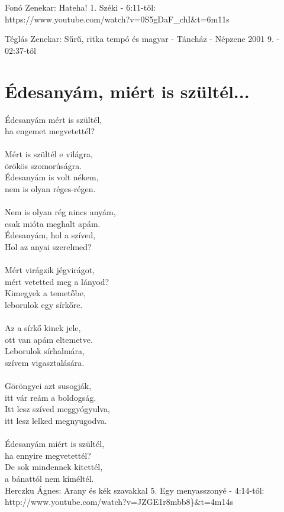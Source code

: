 Fonó Zenekar: Hateha! 1. Széki - 6:11-től:\\
https://www.youtube.com/watch?v=0S5gDaF\_chI\&t=6m11s

Téglás Zenekar: Sűrű, ritka tempó és magyar - Táncház - Népzene 2001 9. - 02:37-től

\section{Édesanyám, miért is szültél...}
Édesanyám mért is szültél,\\
ha engemet megvetettél?\\\\
Mért is szültél e világra,\\
örökös szomorúságra.\\
Édesanyám is volt nékem,\\
nem is olyan réges-régen.\\\\
Nem is olyan rég nincs anyám,\\
csak mióta meghalt apám.\\
Édesanyám, hol a szíved,\\
Hol az anyai szerelmed?\\\\
Mért virágzik jégvirágot,\\
mért vetetted meg a lányod?\\
Kimegyek a temetőbe,\\
leborulok egy sírkőre.\\\\
Az a sírkő kinek jele,\\
ott van apám eltemetve.\\
Leborulok sírhalmára,\\
szívem vigasztalására.\\\\
Göröngyei azt susogják,\\
itt vár reám a boldogság.\\
Itt lesz szíved meggyógyulva,\\
itt lesz lelked megnyugodva.\\\\
Édesanyám miért is szültél,\\
ha ennyire megvetettél?\\
De sok mindennek kitettél,\\
a bánattól nem kíméltél.\\

Herczku Ágnes: Arany és kék szavakkal 5. Egy menyasszonyé - 4:14-től:
http://www.youtube.com/watch?v=JZGE1r8mbb8\}\&t=4m14s


